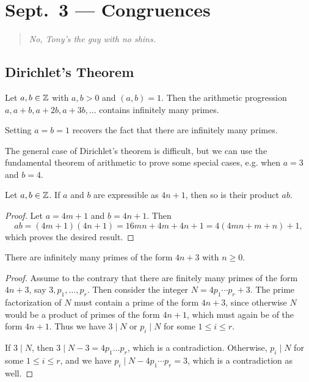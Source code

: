\chapter{Sept.~3 --- Congruences}

\begin{quote}
  \emph{No, Tony's the guy with no shins.}
\end{quote}

\section{Dirichlet's Theorem}

\begin{theorem}
  Let $a, b \in \mathbb{Z}$ with
  $a, b > 0$ and $(a, b) = 1$. Then
  the arithmetic progression
  $a, a + b, a + 2b, a + 3b, \dots$
  contains infinitely many primes.
\end{theorem}

\begin{remark}
  Setting $a = b = 1$ recovers the
  fact that there are infinitely many
  primes.
\end{remark}

\begin{remark}
  The general case of Dirichlet's theorem
  is difficult, but we can use the
  fundamental theorem of arithmetic
  to prove some special cases, e.g.
  when $a = 3$ and $b = 4$.
\end{remark}

\begin{lemma}\label{lem:4n+1-product}
  Let $a, b \in \mathbb{Z}$. If $a$ and $b$ are
  expressible as $4n + 1$, then so is
  their product $ab$.
\end{lemma}

\begin{proof}
  Let $a = 4m + 1$ and $b = 4n + 1$. Then
  \[
    ab = (4m + 1)(4n + 1)
    = 16mn + 4m + 4n + 1
    = 4(4mn + m + n) + 1,
  \]
  which proves the desired result.
\end{proof}

\begin{prop}
  There are infinitely many primes
  of the form $4n + 3$ with $n \ge 0$.
\end{prop}

\begin{proof}
  Assume to the contrary that there are
  finitely many primes of the form
  $4n + 3$, say $3, p_1, \dots, p_r$.
  Then consider the integer
  $N = 4p_1 \cdots p_r + 3$. The prime
  factorization of $N$ must contain a
  prime of the form $4n + 3$, since
  otherwise $N$ would be a product of
  primes of the form $4n + 1$, which
  must again be of the form $4n + 1$.
  Thus we have $3 \mid N$ or $p_i \mid N$
  for some $1 \le i \le r$.

  If $3 \mid N$, then $3 \mid N - 3 = 4p_1 \dots p_r$,
  which is a contradiction.
  Otherwise, $p_i \mid N$ for some
  $1 \le i \le r$, and we have
  $p_i \mid N - 4p_1 \cdots p_r = 3$,
  which is a contradiction as well.
\end{proof}

